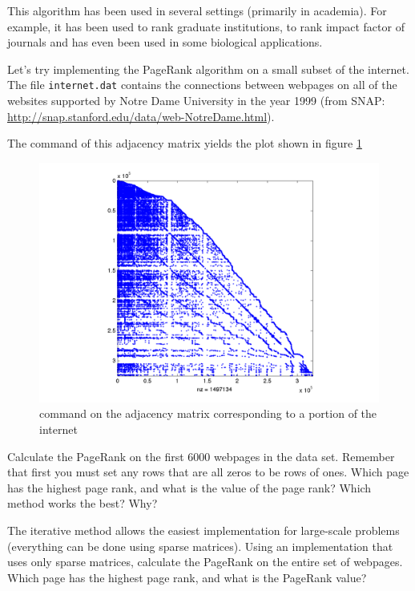This algorithm has been used in several settings (primarily in academia).
For example, it has been used to rank graduate institutions, to rank impact factor of journals and has even been used in some biological applications.

Let's try implementing the PageRank algorithm on a small subset of the internet.
The file \texttt{internet.dat} contains the connections between webpages on all of the websites supported by Notre Dame University in the year 1999 (from SNAP: \url{http://snap.stanford.edu/data/web-NotreDame.html}).

The  command of this adjacency matrix yields the plot shown in figure \ref{Fig:WebSparse}


\begin{figure}
\begin{center}
\includegraphics[scale = .4]{WebSparse.pdf}
\caption{ command on the adjacency matrix corresponding to a portion of the internet}
\label{Fig:WebSparse}
\end{center}
\end{figure}

\begin{problem}
\label{prob:pg_calc}
Calculate the PageRank on the first 6000 webpages in the data set.
Remember that first you must set any rows that are all zeros to be rows of ones.
Which page has the highest page rank, and what is the value of the page rank?
Which method works the best?
Why?
\end{problem}

\begin{problem}
The iterative method allows the easiest implementation for large-scale problems (everything can be done using sparse matrices).
Using an implementation that uses only sparse matrices, calculate the PageRank on the entire set of webpages.
Which page has the highest page rank, and what is the PageRank value?
\end{problem}

